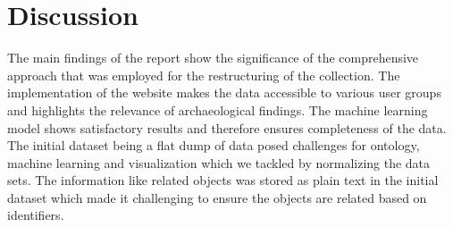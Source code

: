 \section{Discussion} 

The main findings of the report show the significance of the comprehensive approach that was employed for the restructuring of the collection. The implementation of the website makes the data accessible to various user groups and highlights the relevance of archaeological findings. The machine learning model shows satisfactory results and therefore ensures completeness of the data.  The initial dataset being a flat dump of data posed challenges for ontology, machine learning and visualization which we tackled by normalizing the data sets. The information like related objects was stored as plain text in the initial dataset which made it challenging to ensure the objects are related based on identifiers.
